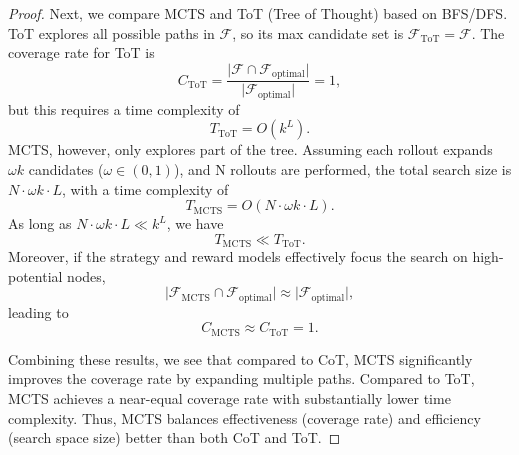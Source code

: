 \documentclass{article}
\theoremstyle{plain}
\theoremstyle{definition}
\theoremstyle{remark}
\begin{document}
\begin{proof}
Next, we compare MCTS and ToT (Tree of Thought) based on BFS/DFS. ToT explores all possible paths in $\mathcal{F}$, so its max candidate set is $\mathcal{F}_{\text{ToT}} = \mathcal{F}$. The coverage rate for ToT is
\begin{equation}
C_{\text{ToT}} = \frac{\lvert \mathcal{F} \cap \mathcal{F}_{\text{optimal}} \rvert}{\lvert \mathcal{F}_{\text{optimal}} \rvert} = 1,
\end{equation}
but this requires a time complexity of
\begin{equation}
T_{\text{ToT}} = O(k^L).
\end{equation}
MCTS, however, only explores part of the tree. Assuming each rollout expands $\omega k$ candidates ($\omega \in (0, 1)$), and N rollouts are performed, the total search size is $N \cdot \omega k \cdot L$, with a time complexity of
\begin{equation}
T_{\text{MCTS}} = O(N \cdot \omega k \cdot L).
\end{equation}
As long as $N \cdot \omega k \cdot L \ll k^L$, we have
\begin{equation}
T_{\text{MCTS}} \ll T_{\text{ToT}}.
\end{equation}
Moreover, if the strategy and reward models effectively focus the search on high-potential nodes,
\begin{equation}
\lvert \mathcal{F}_{\text{MCTS}} \cap \mathcal{F}_{\text{optimal}} \rvert \approx \lvert \mathcal{F}_{\text{optimal}} \rvert,
\end{equation}
leading to
\begin{equation}
C_{\text{MCTS}} \approx C_{\text{ToT}} = 1.
\end{equation}

Combining these results, we see that compared to CoT, MCTS significantly improves the coverage rate by expanding multiple paths. Compared to ToT, MCTS achieves a near-equal coverage rate with substantially lower time complexity. Thus, MCTS balances effectiveness (coverage rate) and efficiency (search space size) better than both CoT and ToT.
\end{proof}
\end{document}
